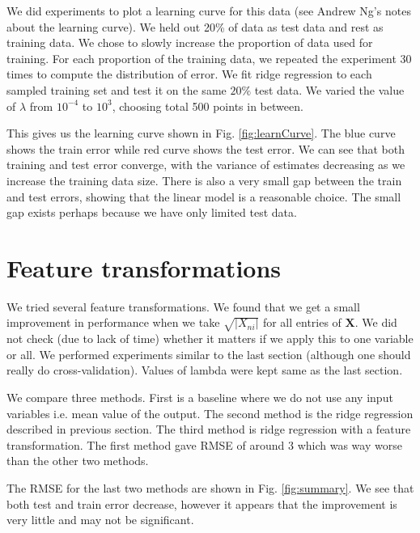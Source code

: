 \documentclass{article} %
\begin{document}
We did experiments to plot a learning curve for this data (see Andrew Ng's notes about the learning curve). We held out 20\% of data as test data and rest as training data. We chose to slowly increase the proportion of data used for training. For each proportion of the training data, we repeated the experiment 30 times to compute the distribution of error. We fit ridge regression to each sampled training set and test it on the same $20\%$ test data. We varied the value of $\lambda$ from $10^{-4}$ to $10^3$, choosing total 500 points in between.

This gives us the learning curve shown in Fig. \ref{fig:learnCurve}. The blue curve shows the train error while red curve shows the test error. We can see that both training and test error converge, with the variance of estimates decreasing as we increase the training data size. There is also a very small gap between the train and test errors, showing that the linear model is a reasonable choice. The small gap exists perhaps because we have only limited test data.

\section{Feature transformations}
We tried several feature transformations. We found that we get a small improvement in performance when we take $\sqrt{|X_{ni}|}$ for all entries of $\mathbf{X}$. We did not check (due to lack of time) whether it matters if we apply this to one variable or all. We performed experiments similar to the last section (although one should really do cross-validation). Values of lambda were kept same as the last section. 

We compare three methods. First is a baseline where we do not use any input variables i.e. mean value of the output. The second method is the ridge regression described in previous section. The third method is ridge regression with a feature transformation. The first method gave RMSE of around 3 which was way worse than the other two methods.

The RMSE for the last two methods are shown in Fig. \ref{fig:summary}. We see that both test and train error decrease, however it appears that the improvement is very little and may not be significant.
\end{document}
